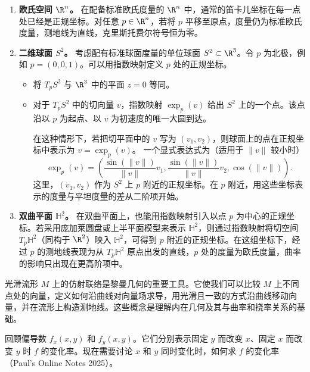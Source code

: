 \begin{enumerate}
\item \textbf{欧氏空间 $\R^n$。}
在配备标准欧氏度量的 $\R^n$ 中，通常的笛卡儿坐标在每一点处已经是正规坐标。对任意 $p\in\R^n$，若将 $p$ 平移至原点，度量仍为标准欧氏度量，测地线为直线，克里斯托费尔符号恒为零。
\item \textbf{二维球面 $S^2$。}
考虑配有标准球面度量的单位球面 $S^2\subset\R^3$。令 $p$ 为北极，例如 $p=(0,0,1)$。可以用指数映射定义 $p$ 处的正规坐标。
\begin{itemize}
\item 将 $T_pS^2$ 与 $\R^3$ 中的平面 $z=0$ 等同。
\item 对于 $T_pS^2$ 中的切向量 $v$，指数映射 $\exp_p(v)$ 给出 $S^2$ 上的一个点。该点沿以 $p$ 为起点、以 $v$ 为初速度的唯一大圆到达。

在这种情形下，若把切平面中的 $v$ 写为 $(v_1,v_2)$，则球面上的点在正规坐标中表示为 $v=\exp_p(v)$。%
%
一个显式表达式为（适用于 $\lVert v\rVert$ 较小时）
\[
  \exp_p(v)=\left(
    \frac{\sin(\lVert v\rVert)}{\lVert v\rVert}v_1,
    \frac{\sin(\lVert v\rVert)}{\lVert v\rVert}v_2,
    \cos(\lVert v\rVert)\right).
\]
这里，$(v_1,v_2)$ 作为 $S^2$ 上 $p$ 附近的正规坐标。在 $p$ 附近，用这些坐标表示的度量与平坦度量的差从二阶项开始。
\end{itemize}
\item \textbf{双曲平面 $\mathbb H^2$。}
在双曲平面上，也能用指数映射引入以点 $p$ 为中心的正规坐标。若采用庞加莱圆盘或上半平面模型来表示 $\mathbb H^2$，则通过指数映射将切空间 $T_p\mathbb H^2$（同构于 $\R^2$）映入 $\mathbb H^2$，可得到 $p$ 附近的正规坐标。在这组坐标下，经过 $p$ 的测地线表现为从 $T_p\mathbb H^2$ 原点出发的直线，$p$ 处的度量为欧氏度量，曲率的影响只出现在更高阶项中。
\end{enumerate}

光滑流形 $M$ 上的仿射联络是黎曼几何的重要工具。它使我们可以比较 $M$ 上不同点处的向量，定义如何沿曲线对向量场求导，用光滑且一致的方式沿曲线移动向量，并在流形上构造测地线。这些概念是理解内在几何及其与曲率和挠率关系的基础。

回顾偏导数 $f_x(x,y)$ 和 $f_y(x,y)$。它们分别表示固定 $y$ 而改变 $x$、固定 $x$ 而改变 $y$ 时 $f$ 的变化率。现在需要讨论 $x$ 和 $y$ 同时变化时，如何求 $f$ 的变化率（Paul's Online Notes 2025）。

